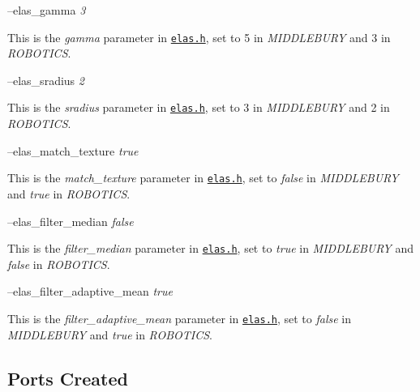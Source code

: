 --elas\+\_\+gamma {\itshape 3} 
\begin{DoxyItemize}
\item This is the {\itshape gamma} parameter in \href{https://github.com/robotology/stereo-vision/tree/master/lib/elas/include/elas.h}{\tt elas.\+h}, set to 5 in {\itshape M\+I\+D\+D\+L\+E\+B\+U\+RY} and 3 in {\itshape R\+O\+B\+O\+T\+I\+CS}.
\end{DoxyItemize}

--elas\+\_\+sradius {\itshape 2} 
\begin{DoxyItemize}
\item This is the {\itshape sradius} parameter in \href{https://github.com/robotology/stereo-vision/tree/master/lib/elas/include/elas.h}{\tt elas.\+h}, set to 3 in {\itshape M\+I\+D\+D\+L\+E\+B\+U\+RY} and 2 in {\itshape R\+O\+B\+O\+T\+I\+CS}.
\end{DoxyItemize}

--elas\+\_\+match\+\_\+texture {\itshape true} 
\begin{DoxyItemize}
\item This is the {\itshape match\+\_\+texture} parameter in \href{https://github.com/robotology/stereo-vision/tree/master/lib/elas/include/elas.h}{\tt elas.\+h}, set to {\itshape false} in {\itshape M\+I\+D\+D\+L\+E\+B\+U\+RY} and {\itshape true} in {\itshape R\+O\+B\+O\+T\+I\+CS}.
\end{DoxyItemize}

--elas\+\_\+filter\+\_\+median {\itshape false} 
\begin{DoxyItemize}
\item This is the {\itshape filter\+\_\+median} parameter in \href{https://github.com/robotology/stereo-vision/tree/master/lib/elas/include/elas.h}{\tt elas.\+h}, set to {\itshape true} in {\itshape M\+I\+D\+D\+L\+E\+B\+U\+RY} and {\itshape false} in {\itshape R\+O\+B\+O\+T\+I\+CS}.
\end{DoxyItemize}

--elas\+\_\+filter\+\_\+adaptive\+\_\+mean {\itshape true} 
\begin{DoxyItemize}
\item This is the {\itshape filter\+\_\+adaptive\+\_\+mean} parameter in \href{https://github.com/robotology/stereo-vision/tree/master/lib/elas/include/elas.h}{\tt elas.\+h}, set to {\itshape false} in {\itshape M\+I\+D\+D\+L\+E\+B\+U\+RY} and {\itshape true} in {\itshape R\+O\+B\+O\+T\+I\+CS}.
\end{DoxyItemize}\hypertarget{group__SFM_portsc_sec}{}\subsection{Ports Created}\label{group__SFM_portsc_sec}

